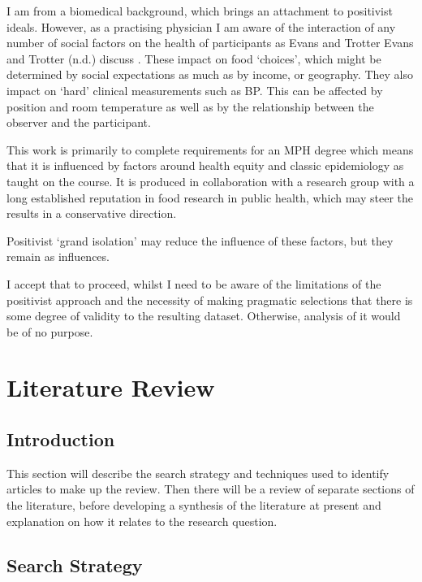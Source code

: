 \documentclass[
]{article}
\begin{document}
I am from a biomedical background, which brings an attachment to
positivist ideals. However, as a practising physician I am aware of the
interaction of any number of social factors on the health of
participants as Evans and Trotter Evans and Trotter (n.d.) discuss .
These impact on food `choices', which might be determined by social
expectations as much as by income, or geography. They also impact on
`hard' clinical measurements such as BP. This can be affected by
position and room temperature as well as by the relationship between the
observer and the participant.

This work is primarily to complete requirements for an MPH degree which
means that it is influenced by factors around health equity and classic
epidemiology as taught on the course. It is produced in collaboration
with a research group with a long established reputation in food
research in public health, which may steer the results in a conservative
direction.

Positivist `grand isolation' may reduce the influence of these factors,
but they remain as influences.

I accept that to proceed, whilst I need to be aware of the limitations
of the positivist approach and the necessity of making pragmatic
selections that there is some degree of validity to the resulting
dataset. Otherwise, analysis of it would be of no purpose.

\newpage

\hypertarget{literature-review}{%
\section{Literature Review}\label{literature-review}}

\hypertarget{introduction-1}{%
\subsection{Introduction}\label{introduction-1}}

This section will describe the search strategy and techniques used to
identify articles to make up the review. Then there will be a review of
separate sections of the literature, before developing a synthesis of
the literature at present and explanation on how it relates to the
research question.

\hypertarget{search-strategy}{%
\subsection{Search Strategy}\label{search-strategy}}
\end{document}
